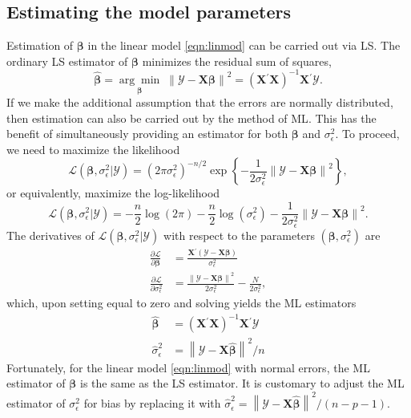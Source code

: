 \documentclass[cmfont,usenames,dvipsnames,leqno]{afit-etd}\usepackage[]{graphicx}\usepackage[]{color}
\newcommand{\loglik}{\mathscr{L}}
\newcommand{\norm}[1]{\left\|#1\right\|}
\newcommand{\trans}{\ensuremath{^\prime}}
\newcommand{\bc}[1]{\ensuremath{\bm{\mathcal{#1}}}}
\newcommand{\mc}[1]{\ensuremath{\mathcal{#1}}}
\newcommand{\wh}[1]{\ensuremath{\widehat{#1}}}
\newcommand{\argmin}[1]{\underset{#1}{\operatorname{arg}\!\operatorname{min}}\;}
\newcommand{\X}{\ensuremath{\bm{X}}}
\begin{document}
\subsection{Estimating the model parameters}
Estimation of $\bm{\beta}$ in the linear model \eqref{eqn:linmod} can be carried out via \ac{LS}. The ordinary \ac{LS} estimator of $\bm{\beta}$ minimizes the residual sum of squares, 
\begin{equation}
\label{eqn:beta-ols}
  \wh{\bm{\beta}} = \argmin{\bm{\beta}} \norm{\bc{Y} - \X\bm{\beta}}^2 = \left(\X\trans\X\right)^{-1}\X\trans\bc{Y}.
\end{equation}
If we make the additional assumption that the errors are normally distributed, then estimation can also be carried out by the method of \ac{ML}. This has the benefit of simultaneously providing an estimator for both $\bm{\beta}$ and $\sigma_\epsilon^2$. To proceed, we need to maximize the likelihood
\begin{equation*}
  \mc{L}\left(\bm{\beta}, \sigma_\epsilon^2 | \bc{Y}\right) = \left(2\pi\sigma_\epsilon^2\right)^{-n/2}\exp\left\{ -\frac{1}{2\sigma_\epsilon^2}\norm{\bc{Y} - \X\bm{\beta}}^2 \right\},
\end{equation*}
or equivalently, maximize the log-likelihood
\begin{equation*}
  \loglik\left(\bm{\beta}, \sigma_\epsilon^2 | \bc{Y}\right) = -\frac{n}{2}\log\left(2\pi\right) - \frac{n}{2}\log\left(\sigma_\epsilon^2\right) - \frac{1}{2\sigma_\epsilon^2}\norm{\bc{Y} - \X\bm{\beta}}^2.
\end{equation*}
The derivatives of $\loglik(\bm{\beta}, \sigma_\epsilon^2 | \bc{Y})$ with respect to the parameters $\left(\bm{\beta}, \sigma_\epsilon^2\right)$ are
\begin{align*}
  \frac{\partial\loglik}{\partial\bm{\beta}} &= \frac{\X\trans(\bc{Y} - \X\bm{\beta})}{\sigma_\epsilon^2}\\
  \frac{\partial\loglik}{\partial\sigma_\epsilon^2} &= \frac{\norm{\bc{Y} - \X\bm{\beta}}^2}{2\sigma_\epsilon^2} - \frac{N}{2\sigma_\epsilon^2},
\end{align*}
which, upon setting equal to zero and solving yields the \ac{ML} estimators
\begin{align*}
  \wh{\bm{\beta}} &= (\X\trans\X)^{-1}\X\trans\bc{Y} \\
  \wh{\sigma}_\epsilon^2 &= \norm{\bc{Y} - \X\wh{\bm{\beta}}}^2/n
\end{align*}
Fortunately, for the linear model \eqref{eqn:linmod} with normal errors, the \ac{ML} estimator of $\bm{\beta}$ is the same as the \ac{LS} estimator. It is customary to adjust the \ac{ML} estimator of $\sigma_\epsilon^2$ for bias by replacing it with $\wh{\sigma}_\epsilon^2 = \norm{\bc{Y} - \X\wh{\bm{\beta}}}^2/(n-p-1)$.
\end{document}
